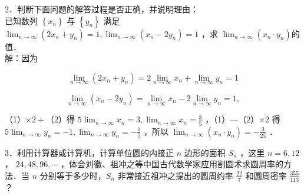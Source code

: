 \documentclass[10pt]{article}
\begin{document}
2．判断下面问题的解答过程是否正确，并说明理由：\\
已知数列 \(\left\{x_{n}\right\}\) 与 \(\left\{y_{n}\right\}\) 满足 \(\lim _{n \rightarrow \infty}\left(2 x_{n}+y_{n}\right)=1, \lim _{n \rightarrow \infty}\left(x_{n}-2 y_{n}\right)=1\) ，求 \(\lim _{n \rightarrow \infty}\left(x_{n} \cdot y_{n}\right)\)的值．\\
解：因为

\[
\lim _{n \rightarrow \infty}\left(2 x_{n}+y_{n}\right)=2 \lim _{n \rightarrow \infty} x_{n}+\lim _{n \rightarrow \infty} y_{n}=1
\]

\[
\lim _{n \rightarrow \infty}\left(x_{n}-2 y_{n}\right)=\lim _{n \rightarrow \infty} x_{n}-2 \lim _{n \rightarrow \infty} y_{n}=1,
\]

（1）\(\times 2+\)（2）得 \(5 \lim _{n \rightarrow \infty} x_{n}=3, \lim _{n \rightarrow \infty} x_{n}=\frac{3}{5}\) ，（1）—（2）\(\times 2\) 得 \(5 \lim _{n \rightarrow \infty} y_{n}=-1, \lim _{n \rightarrow \infty} y_{n}=-\frac{1}{5}\) ，所以 \(\lim _{n \rightarrow \infty}\left(x_{n} \cdot y_{n}\right)=-\frac{3}{25}\) ．

3．利用计算器或计算机，计算单位圆的内接正 \(n\) 边形的面积 \(S_{n}\) ，这里 \(n=6,12\) ， \(24,48,96, \cdots\) ，体会刘徽、祖冲之等中国古代数学家应用割圆术求圆周率的方法．当 \(n\) 分别等于多少时，\(S_{n}\) 非常接近祖冲之提出的圆周约率 \(\frac{22}{7}\) 和圆周密率 \(\frac{355}{113}\) ？
\end{document}
